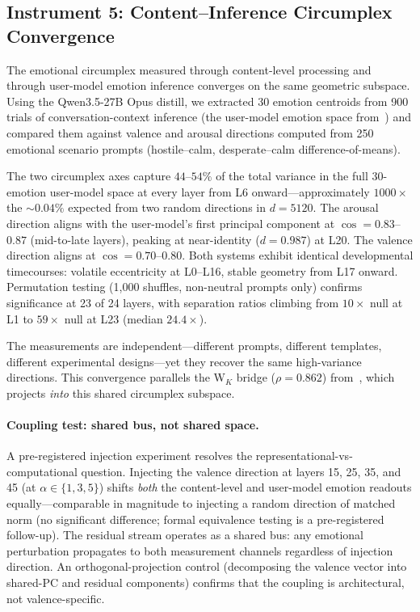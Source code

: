 \subsection{Instrument 5: Content--Inference Circumplex Convergence}

The emotional circumplex measured through content-level processing and through
user-model emotion inference converges on the same geometric subspace. Using the
Qwen3.5-27B Opus distill, we extracted 30 emotion centroids from 900 trials of
conversation-context inference (the user-model emotion space from~\citet{lyra2026weather})
and compared them against valence and arousal directions computed from 250 emotional
scenario prompts (hostile--calm, desperate--calm difference-of-means).

The two circumplex axes capture $44$--$54\%$ of the total variance in the full
30-emotion user-model space at every layer from L6 onward---approximately $1000\times$
the ${\sim}0.04\%$ expected from two random directions in $d{=}5120$. The arousal
direction aligns with the user-model's first principal component at
$\cos = 0.83$--$0.87$ (mid-to-late layers), peaking at near-identity
($d = 0.987$) at L20. The valence direction aligns at
$\cos = 0.70$--$0.80$. Both systems exhibit identical developmental timecourses:
volatile eccentricity at L0--L16, stable geometry from L17 onward. Permutation
testing (1{,}000 shuffles, non-neutral prompts only) confirms significance at
23 of 24 layers, with separation ratios climbing from $10\times$ null at L1 to
$59\times$ null at L23 (median $24.4\times$).

The measurements are independent---different prompts, different templates, different
experimental designs---yet they recover the same high-variance directions. This
convergence parallels the W$_K$ bridge ($\rho = 0.862$) from~\citet{lyra2026weather},
which projects \emph{into} this shared circumplex subspace.

\paragraph{Coupling test: shared bus, not shared space.}
A pre-registered injection experiment resolves the representational-vs-computational
question. Injecting the valence direction at layers 15, 25, 35, and 45 (at
$\alpha \in \{1, 3, 5\}$) shifts \emph{both} the content-level and user-model
emotion readouts equally---comparable in magnitude to injecting a random direction
of matched norm (no significant difference; formal equivalence testing is a
pre-registered follow-up). The residual stream operates as a shared bus: any emotional
perturbation propagates to both measurement channels regardless of injection
direction. An orthogonal-projection control (decomposing the valence vector into
shared-PC and residual components) confirms that the coupling is architectural,
not valence-specific.


